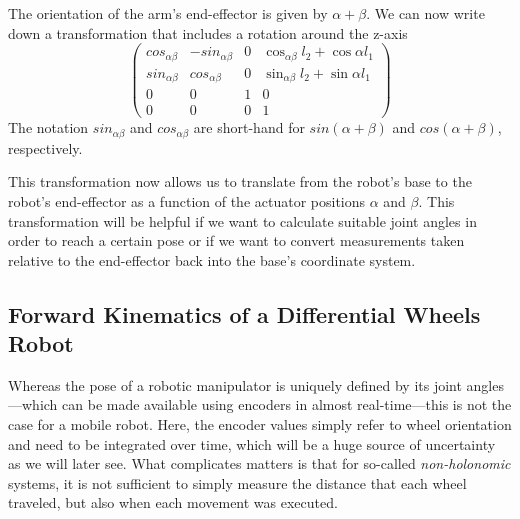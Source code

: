 The orientation of the arm's end-effector is given by $\alpha+\beta$. We can now write down  a transformation that includes a rotation around the z-axis
\begin{equation}
\label{eq:2armtrans}
\left(\begin{array}{llll}cos_{\alpha\beta} & -sin_{\alpha\beta} &  0 & \cos_{\alpha\beta}l_2+\cos\alpha l_1\\
                        sin_{\alpha\beta} & cos_{\alpha\beta} & 0 & \sin_{\alpha\beta}l_2+\sin\alpha l_1\\
												0 & 0 & 1 & 0\\
												0 & 0 & 0 & 1\end{array}\right)
\end{equation}
The notation $sin_{\alpha\beta}$ and $cos_{\alpha\beta}$ are short-hand for $sin(\alpha+\beta)$ and $cos(\alpha+\beta)$, respectively.

This transformation now allows us to translate from the robot's base to the robot's end-effector as a function of the actuator positions $\alpha$ and $\beta$. This transformation will be helpful if we want to calculate suitable joint angles in order to reach a certain pose or if we want to convert measurements taken relative to the end-effector back into the base's coordinate system. 

\subsection{Forward Kinematics of a Differential Wheels Robot}\label{sec:fwkmobile}
Whereas the pose of a robotic manipulator is uniquely defined by its joint angles---which can be made available using encoders in almost real-time---this is not the case for a mobile robot. Here, the encoder values simply refer to wheel orientation and need to be integrated over time, which will be a huge source of uncertainty as we will later see.
What complicates matters is that for so-called \emph{non-holonomic} systems, it is not sufficient to simply measure the distance that each wheel traveled, but also when each movement was executed. 

